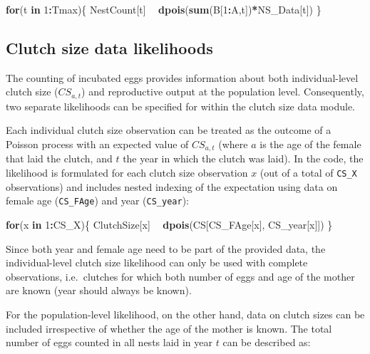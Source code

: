 \documentclass[
]{book}
\newenvironment{Shaded}{\begin{snugshade}}{\end{snugshade}}
\newcommand{\ControlFlowTok}[1]{\textcolor[rgb]{0.13,0.29,0.53}{\textbf{#1}}}
\newcommand{\DecValTok}[1]{\textcolor[rgb]{0.00,0.00,0.81}{#1}}
\newcommand{\KeywordTok}[1]{\textcolor[rgb]{0.13,0.29,0.53}{\textbf{#1}}}
\newcommand{\NormalTok}[1]{#1}
\newcommand{\OperatorTok}[1]{\textcolor[rgb]{0.81,0.36,0.00}{\textbf{#1}}}
\newcommand{\StringTok}[1]{\textcolor[rgb]{0.31,0.60,0.02}{#1}}
\begin{document}
\begin{Shaded}
\begin{Highlighting}[]
\ControlFlowTok{for}\NormalTok{(t }\ControlFlowTok{in} \DecValTok{1}\OperatorTok{:}\NormalTok{Tmax)\{}
\NormalTok{  NestCount[t] }\OperatorTok{~}\StringTok{ }\KeywordTok{dpois}\NormalTok{(}\KeywordTok{sum}\NormalTok{(B[}\DecValTok{1}\OperatorTok{:}\NormalTok{A,t])}\OperatorTok{*}\NormalTok{NS_Data[t])}
\NormalTok{\}}
\end{Highlighting}
\end{Shaded}

\hypertarget{clutch-size-data-likelihoods}{%
\subsection{Clutch size data likelihoods}\label{clutch-size-data-likelihoods}}

The counting of incubated eggs provides information about both individual-level
clutch size (\(CS_{a,t}\)) and reproductive output at the population level.
Consequently, two separate likelihoods can be specified for within the clutch
size data module.

Each individual clutch size observation can be treated as the outcome of a
Poisson process with an expected value of \(CS_{a,t}\) (where \(a\) is the age of
the female that laid the clutch, and \(t\) the year in which the clutch was laid).
In the code, the likelihood is formulated for each clutch size observation \(x\)
(out of a total of \texttt{CS\_X} observations) and includes nested indexing of the
expectation using data on female age (\texttt{CS\_FAge}) and year (\texttt{CS\_year}):

\begin{Shaded}
\begin{Highlighting}[]
\ControlFlowTok{for}\NormalTok{(x }\ControlFlowTok{in} \DecValTok{1}\OperatorTok{:}\NormalTok{CS_X)\{}
\NormalTok{    ClutchSize[x] }\OperatorTok{~}\StringTok{ }\KeywordTok{dpois}\NormalTok{(CS[CS_FAge[x], CS_year[x]])}
\NormalTok{\}}
\end{Highlighting}
\end{Shaded}

Since both year and female age need to be part of the provided data, the
individual-level clutch size likelihood can only be used with complete
observations, i.e.~clutches for which both number of eggs and age of the mother
are known (year should always be known).

For the population-level likelihood, on the other hand, data on clutch sizes can
be included irrespective of whether the age of the mother is known. The total
number of eggs counted in all nests laid in year \(t\) can be described as:
\end{document}
